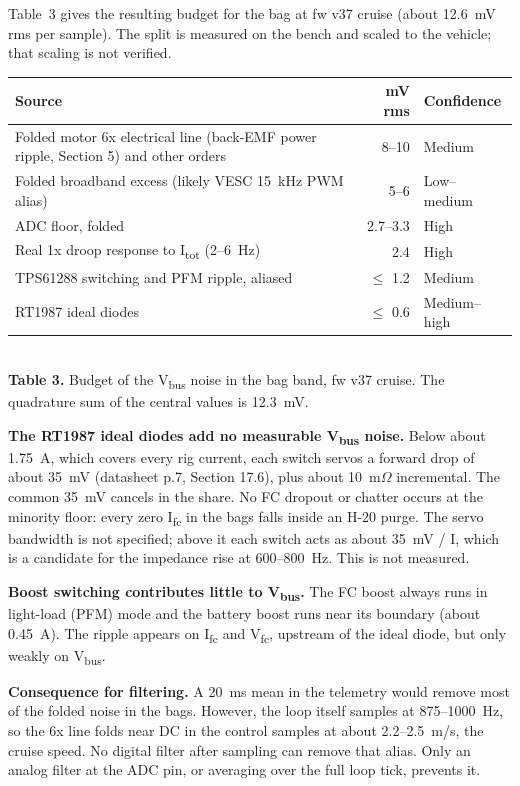 \documentclass[10pt]{article}
\newcommand{\Itot}{I\textsubscript{tot}}
\newcommand{\Vbus}{V\textsubscript{bus}}
\begin{document}
Table~3 gives the resulting budget for the bag at fw v37 cruise (about 12.6~mV rms per sample).
The split is measured on the bench and scaled to the vehicle; that scaling is not verified.

\begin{center}
\small
\begin{tabular}{lrl}
\toprule
Source & mV rms & Confidence \\
\midrule
Folded motor 6x electrical line (back-EMF power ripple, Section 5) and other orders & 8--10 & Medium \\
Folded broadband excess (likely VESC 15~kHz PWM alias) & 5--6 & Low--medium \\
ADC floor, folded & 2.7--3.3 & High \\
Real 1x droop response to \Itot{} (2--6~Hz) & 2.4 & High \\
TPS61288 switching and PFM ripple, aliased & $\leq$ 1.2 & Medium \\
RT1987 ideal diodes & $\leq$ 0.6 & Medium--high \\
\bottomrule
\end{tabular}\\[0.3em]
\textbf{Table 3.} Budget of the \Vbus{} noise in the bag band, fw v37 cruise. The quadrature sum
of the central values is 12.3~mV.
\end{center}

\textbf{The RT1987 ideal diodes add no measurable \Vbus{} noise.} Below about 1.75~A, which covers
every rig current, each switch servos a forward drop of about 35~mV (datasheet p.7, Section 17.6),
plus about 10~m$\Omega$ incremental. The common 35~mV cancels in the share. No FC dropout or chatter
occurs at the minority floor: every zero I\textsubscript{fc} in the bags falls inside an H-20
purge. The servo bandwidth is not specified; above it each switch acts as about 35~mV / I, which
is a candidate for the impedance rise at 600--800~Hz. This is not measured.

\textbf{Boost switching contributes little to \Vbus.} The FC boost always runs in light-load (PFM)
mode and the battery boost runs near its boundary (about 0.45~A). The ripple appears on
I\textsubscript{fc} and V\textsubscript{fc}, upstream of the ideal diode, but only weakly on \Vbus.

\textbf{Consequence for filtering.} A 20~ms mean in the telemetry would remove most of the folded
noise in the bags. However, the loop itself samples at 875--1000~Hz, so the 6x line folds near DC
in the control samples at about 2.2--2.5~m/s, the cruise speed. No digital filter after sampling
can remove that alias. Only an analog filter at the ADC pin, or averaging over the full loop
tick, prevents it.
\end{document}
